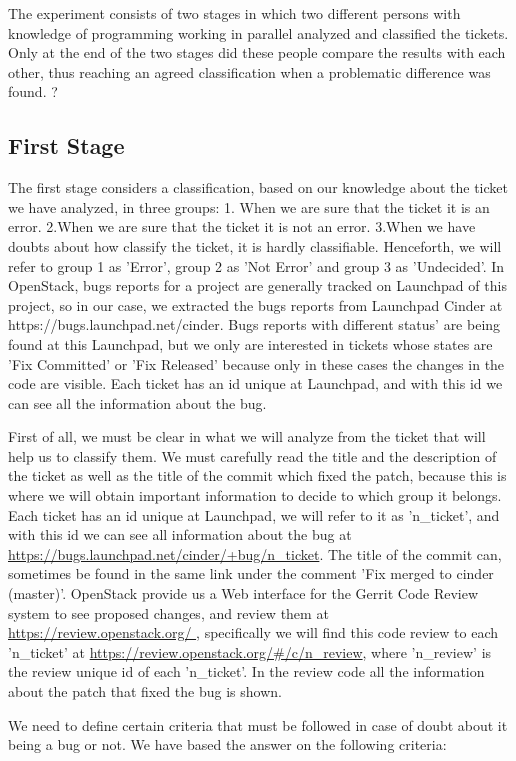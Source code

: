 \documentclass[a4paper]{article}
\begin{document}
The experiment consists of two stages in which two different persons with knowledge of programming working in parallel analyzed and classified the tickets. Only at the end of the two stages did these people compare the results with each other, thus reaching an agreed classification when a problematic difference was found. ?
\subsection{First Stage}
The first stage considers a classification, based on our knowledge about the ticket we have analyzed, in three groups: 1. When we are sure that the ticket it is an error. 2.When we are sure that the ticket it is not an error. 3.When we have doubts about how classify the ticket, it is hardly classifiable. Henceforth, we will refer to group 1 as 'Error', group 2 as 'Not Error' and group 3 as 'Undecided'. In OpenStack, bugs reports for a project are generally tracked on Launchpad of this project, so in our case, we extracted the bugs reports from Launchpad Cinder at https://bugs.launchpad.net/cinder. Bugs reports with different status' are being found at this Launchpad, but we only are interested in tickets whose states are 'Fix Committed' or 'Fix Released' because only in these cases the changes in the code are visible. Each ticket has an id unique at Launchpad, and with this id we can see all the information about the bug. 

First of all, we must be clear in what we will analyze from the ticket that will help us to classify them. We must carefully read the title and the description of the ticket as well as the title of the commit which fixed the patch, because this is where we will obtain important information to decide to which group it belongs. Each ticket has an id unique at Launchpad, we will refer to it as 'n\_ticket', and with this id we can see all information about the bug at  \url{https://bugs.launchpad.net/cinder/+bug/n_ticket}. The title of the commit can, sometimes be found in the same link under the comment 'Fix merged to cinder (master)'. OpenStack provide us a Web interface for the Gerrit Code Review system to see proposed changes, and review them at \url{https://review.openstack.org/ }, specifically we will find this code review to each 'n\_ticket' at \url{https://review.openstack.org/#/c/n_review}, where 'n\_review' is the review unique id of each 'n\_ticket'. In the review code all the information about the patch that fixed the bug is shown.

We need to define certain criteria that must be followed in case of doubt about it being a bug or not. We have based the answer on the following criteria: 
\end{document}
